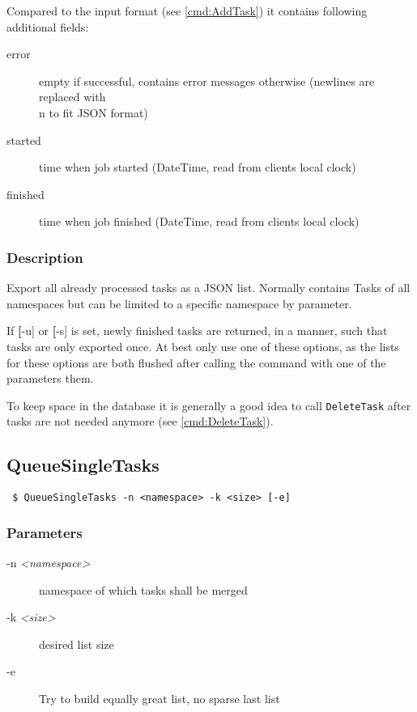 \documentclass[a4paper,11pt]{article}
\begin{document}
Compared to the input format (see \ref{cmd:AddTask}) it contains following additional fields:
\begin{description}
\item[error] empty if successful, contains error messages otherwise (newlines are replaced with \\n to fit JSON format)
\item[started] time when job started (DateTime, read from clients local clock)
\item[finished] time when job finished (DateTime, read from clients local clock)
\end{description}


\subsubsection{Description}
Export all already processed tasks as a JSON list. Normally contains Tasks of all namespaces but can be limited to a specific namespace by parameter.

If \textbf[-u] or \textbf[-s] is set, newly finished tasks are returned, in a manner, such that tasks are only exported once. At best only use one of these options, as the lists for these options are both flushed after calling the command with one of the parameters them.

To keep space in the database it is generally a good idea to call \texttt{DeleteTask} after tasks are not needed anymore (see \ref{cmd:DeleteTask}).

\newpage

\subsection{QueueSingleTasks\label{cmd:QueueSingleTasks}}
\begin{verbatim}
 $ QueueSingleTasks -n <namespace> -k <size> [-e]
\end{verbatim}

\subsubsection{Parameters}
\begin{description}
\item[-n \textit{<namespace>}] namespace of which tasks shall be merged
\item[-k \textit{<size>}] desired list size
\item[-e] Try to build equally great list, no sparse last list
\end{description}
\end{document}
